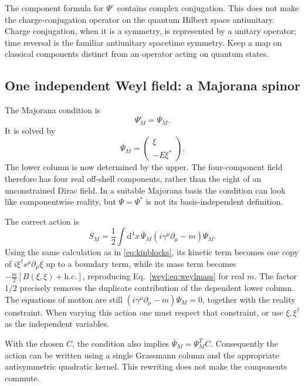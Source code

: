\documentclass[11pt]{article}
\newcommand{\dd}{\mathrm{d}}
\newcommand{\hc}{\mathrm{h.c.}}
\begin{document}
\begin{warningbox}
The component formula for \(\Psi^c\) contains complex conjugation.
This does not make the charge-conjugation operator on the quantum
Hilbert space antiunitary. Charge conjugation, when it is a symmetry,
is represented by a unitary operator; time reversal is the familiar
antiunitary spacetime symmetry. Keep a map on classical components
distinct from an operator acting on quantum states.
\end{warningbox}

\subsection{One independent Weyl field: a Majorana spinor}
The Majorana condition is
\begin{equation}
 \boxed{\Psi_M^c=\Psi_M.}
 \label{eq:Majorana}
\end{equation}
It is solved by
\begin{equation}
 \Psi_M=\begin{pmatrix}\xi\\-E\xi^*\end{pmatrix}.
 \label{eq:Mpack}
\end{equation}
The lower column is now determined by the upper. The four-component
field therefore has four real off-shell components, rather than the
eight of an unconstrained Dirac field. In a suitable Majorana basis
the condition can look like componentwise reality, but
\(\Psi=\Psi^*\) is not its basis-independent definition.

The correct action is
\begin{equation}
 \boxed{S_M=\frac12\int\dd^4x\,
            \bar\Psi_M(i\gamma^\mu\partial_\mu-m)\Psi_M.}
 \label{eq:Majoranaaction}
\end{equation}
Using the same calculation as in \eqref{eq:kinblocks}, its kinetic
term becomes one copy of \(i\xi^\dagger s^\mu\partial_\mu\xi\)
up to a boundary term, while its mass term becomes
\(-\tfrac{m}{2}[B(\xi,\xi)+\hc]\), reproducing
Eq.~\eqref{weyl:eq:weylmass} for real \(m\). The factor \(1/2\) precisely
removes the duplicate contribution of the dependent lower column.
The equations of motion are still
\((i\gamma^\mu\partial_\mu-m)\Psi_M=0\), together with the reality
constraint. When varying this action one must respect that constraint,
or use \(\xi,\xi^\dagger\) as the independent variables.

With the chosen \(C\), the condition also implies
\(\bar\Psi_M=\Psi_M^T C\). Consequently the action can be written
using a single Grassmann column and the appropriate antisymmetric
quadratic kernel. This rewriting does not make the components commute.
\end{document}
